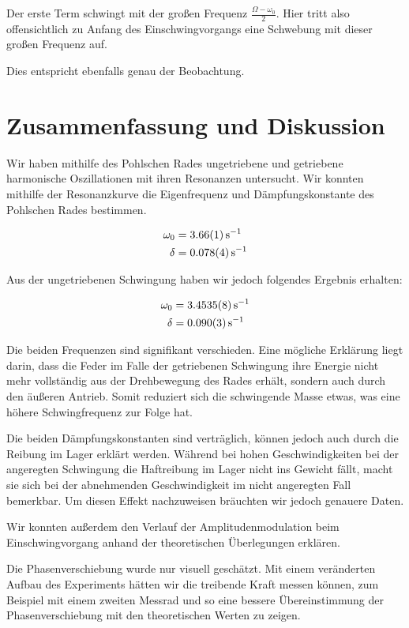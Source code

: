 \documentclass[a4paper,german,12pt,smallheadings]{scrartcl}
\begin{document}
Der erste Term schwingt mit der großen Frequenz $\frac{\Omega - \omega_0}{2}$.
Hier tritt also offensichtlich zu Anfang des Einschwingvorgangs eine Schwebung
mit dieser großen Frequenz auf.

Dies entspricht ebenfalls genau der Beobachtung.

\section{Zusammenfassung und Diskussion}
Wir haben mithilfe des Pohlschen Rades ungetriebene und getriebene harmonische
Oszillationen mit ihren Resonanzen untersucht. Wir konnten mithilfe der
Resonanzkurve die Eigenfrequenz und Dämpfungskonstante des Pohlschen Rades
bestimmen.

\begin{align}
  \omega_0 &= \SI{3.66+-0.01}{s^{-1}} \\
  \delta &= \SI{0.078+-0.004}{s^{-1}}
\end{align}

Aus der ungetriebenen Schwingung haben wir jedoch folgendes Ergebnis erhalten:

\begin{align}
  \omega_0 &= \SI{3.4535+-0.0008}{s^{-1}} \\
  \delta &= \SI{0.090+-0.003}{s^{-1}}
\end{align}

Die beiden Frequenzen sind signifikant verschieden. Eine mögliche Erklärung
liegt darin, dass die Feder im Falle der getriebenen Schwingung ihre Energie
nicht mehr vollständig aus der Drehbewegung des Rades erhält, sondern auch
durch den äußeren Antrieb. Somit reduziert sich die schwingende Masse etwas,
was eine höhere Schwingfrequenz zur Folge hat.

Die beiden Dämpfungskonstanten sind verträglich, können jedoch auch durch die
Reibung im Lager erklärt werden. Während bei hohen Geschwindigkeiten bei der
angeregten Schwingung die Haftreibung im Lager nicht ins Gewicht fällt, macht
sie sich bei der abnehmenden Geschwindigkeit im nicht angeregten Fall
bemerkbar. Um diesen Effekt nachzuweisen bräuchten wir jedoch genauere Daten.

Wir konnten außerdem den Verlauf der Amplitudenmodulation beim
Einschwingvorgang anhand der theoretischen Überlegungen erklären.

Die Phasenverschiebung wurde nur visuell geschätzt. Mit einem veränderten
Aufbau des Experiments hätten wir die treibende Kraft messen können, zum
Beispiel mit einem zweiten Messrad und so eine bessere Übereinstimmung der
Phasenverschiebung mit den theoretischen Werten zu zeigen.
\end{document}
